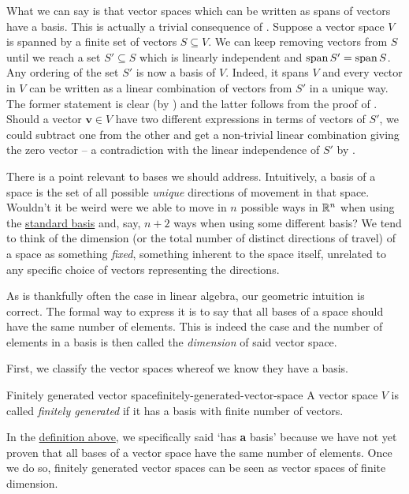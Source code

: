 What we can say is that vector spaces which can be written as spans of vectors
have a basis. This is actually a trivial consequence of
. Suppose a vector space $V$ is
spanned by a finite set of vectors $S \subseteq V$. We can keep removing vectors
from $S$ until we reach a set $S' \subseteq S$ which is linearly independent and
$\operatorname{span} S' = \operatorname{span} S$. Any ordering of the set $S'$ is now a basis of $V$. Indeed,
it spans $V$ and every vector in $V$ can be written as a linear combination of
vectors from $S'$ in a unique way. The former statement is clear (by
) and the latter follows from the proof of
. Should a vector $\mathbf{v}
\in V$ have two different expressions in terms of vectors of $S'$, we could
subtract one from the other and get a non-trivial linear combination giving the
zero vector -- a contradiction with the linear independence of $S'$ by
.

There is a point relevant to bases we should address. Intuitively, a basis of a
space is the set of all possible \emph{unique} directions of movement in that
space. Wouldn't it be weird were we able to move in $n$ possible ways in
$\mathbb{R}^{n}$ when using the \hyperref[def:standard-basis]{standard basis} and, say,
$n + 2$ ways when using some different basis? We tend to think of the dimension
(or the total number of distinct directions of travel) of a space as something
\emph{fixed}, something inherent to the space itself, unrelated to any specific
choice of vectors representing the directions.

As is thankfully often the case in linear algebra, our geometric intuition is
correct. The formal way to express it is to say that all bases of a space should
have the same number of elements. This is indeed the case and the number of
elements in a basis is then called the \emph{dimension} of said vector space.

First, we classify the vector spaces whereof we know they have a basis.

\begin{definition}{Finitely generated vector space}{finitely-generated-vector-space}
 A vector space $V$ is called \emph{finitely generated} if it has a basis with
 finite number of vectors.
\end{definition}

\begin{remark}{}{}
 In the \hyperref[def:finitely-generated-vector-space]{definition above}, we
 specifically said `has \textbf{a} basis' because we have not yet proven that
 all bases of a vector space have the same number of elements. Once we do so,
 finitely generated vector spaces can be seen as vector spaces of finite
 dimension.
\end{remark}

